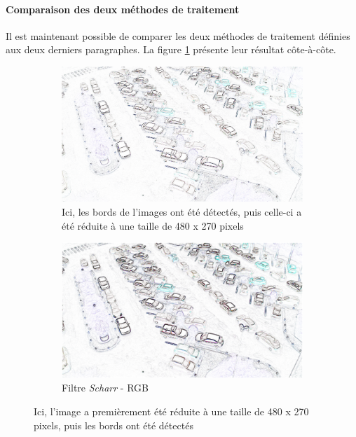 \paragraph{Comparaison des deux méthodes de traitement}

Il est maintenant possible de comparer les deux méthodes de traitement définies aux deux derniers paragraphes. La figure \ref{fig:image_process_compare} présente leur résultat côte-à-côte.

\begin{figure}[H]
    \begin{subfigure}{\textwidth}
        \centering
        \includegraphics[width=.8\linewidth]{img/conception/image_process/edge-downsample/2.png}
        \caption{Ici, les bords de l'images ont été détectés, puis celle-ci a été réduite à une taille de 480 x 270 pixels}
    \end{subfigure}%

    \bigskip
    \begin{subfigure}{\textwidth}
        \centering
        \includegraphics[width=.8\linewidth]{img/conception/image_process/downsample-edge/4.png}
        \caption{Filtre \textit{Scharr} - RGB}
    \end{subfigure}%
    \centering
    \caption{Ici, l'image a premièrement été réduite à une taille de 480 x 270 pixels, puis les bords ont été détectés}
    \label{fig:image_process_compare}
\end{figure}

